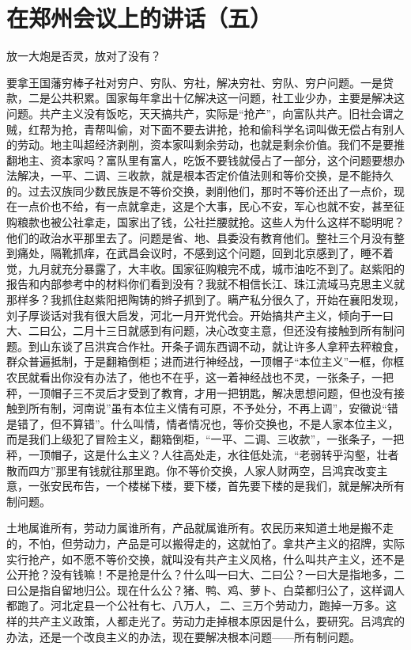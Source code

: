 \section[在郑州会议上的讲话（五）（一九五九年三月五日）]{在郑州会议上的讲话（五）}


放一大炮是否灵，放对了没有？

要拿王国藩穷棒子社对穷户、穷队、穷社，解决穷社、穷队、穷户问题。一是贷款，二是公共积累。国家每年拿出十亿解决这一问题，社工业少办，主要是解决这问题。共产主义没有饭吃，天天搞共产，实际是“抢产”，向富队共产。旧社会谓之贼，红帮为抢，青帮叫偷，对下面不要去讲抢，抢和偷科学名词叫做无偿占有别人的劳动。地主叫超经济剥削，资本家叫剩余劳动，也就是剩余价值。我们不是要推翻地主、资本家吗？富队里有富人，吃饭不要钱就侵占了一部分，这个问题要想办法解决，一平、二调、三收款，就是根本否定价值法则和等价交换，是不能持久的。过去汉族同少数民族是不等价交换，剥削他们，那时不等价还出了一点价，现在一点价也不给，有一点就拿走，这是个大事，民心不安，军心也就不安，甚至征购粮款也被公社拿走，国家出了钱，公社拦腰就抢。这些人为什么这样不聪明呢？他们的政治水平那里去了。问题是省、地、县委没有教育他们。整社三个月没有整到痛处，隔靴抓痒，在武昌会议时，不感到这个问题，回到北京感到了，睡不着觉，九月就充分暴露了，大丰收。国家征购粮完不成，城市油吃不到了。赵紫阳的报告和内部参考中的材料你们看到没有？我就不相信长江、珠江流域马克思主义就那样多？我抓住赵紫阳把陶铸的辫子抓到了。瞒产私分很久了，开始在襄阳发现，刘子厚谈话对我有很大启发，河北一月开党代会。开始搞共产主义，倾向于一曰大、二曰公，二月十三日就感到有问题，决心改变主意，但还没有接触到所有制问题。到山东谈了吕洪宾合作社。开条子调东西调不动，就让许多人拿秤去秤粮食，群众普遍抵制，于是翻箱倒柜；进而进行神经战，一顶帽子“本位主义”一框，你框农民就看出你没有办法了，他也不在乎，这一着神经战也不灵，一张条子，一把秤，一顶帽子三不灵后才受到了教育，才用一把钥匙，解决思想问题，但也没有接触到所有制，河南说”虽有本位主义情有可原，不予处分，不再上调”，安徽说“错是错了，但不算错”。什么叫情，情者情况也，等价交换也，不是人家本位主义，而是我们上级犯了冒险主义，翻箱倒柜，“一平、二调、三收款”，一张条子，一把秤，一顶帽子，这是什么主义？人往高处走，水往低处流，“老弱转乎沟壑，壮者散而四方”那里有钱就往那里跑。你不等价交换，人家人财两空，吕鸿宾改变主意，一张安民布告，一个楼梯下楼，要下楼，首先要下楼的是我们，就是解决所有制问题。

土地属谁所有，劳动力属谁所有，产品就属谁所有。农民历来知道土地是搬不走的，不怕，但劳动力，产品是可以搬得走的，这就怕了。拿共产主义的招牌，实际实行抢产，如不愿不等价交换，就叫没有共产主义风格，什么叫共产主义，还不是公开抢？没有钱嘛！不是抢是什么？什么叫一曰大、二曰公？一曰大是指地多，二曰公是指自留地归公。现在什么公？猪、鸭、鸡、萝卜、白菜都归公了，这样调人都跑了。河北定县一个公社有七、八万人，二、三万个劳动力，跑掉一万多。这样的共产主义政策，人都走光了。劳动力走掉根本原因是什么，要研究。吕鸿宾的办法，还是一个改良主义的办法，现在要解决根本问题——所有制问题。

